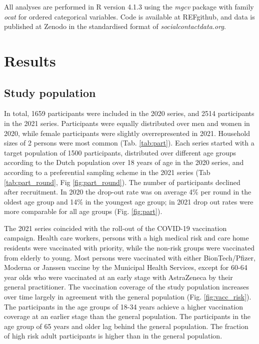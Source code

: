 \documentclass[fleqn,10pt]{wlscirep}
\begin{document}
All analyses are performed in R version 4.1.3 \cite{R_2022} using the \textit{mgcv} package \cite{Wood_2017} with family \textit{ocat} for ordered categorical variables. Code is available at REFgithub, and data is published at Zenodo \cite{Bogaardt_2022} in the standardised format of \textit{socialcontactdata.org}.

\section*{Results}

\subsection*{Study population}

In total, 1659 participants were included in the 2020 series, and 2514 participants in the 2021 series. Participants were equally distributed over men and women in 2020, while female participants were slightly overrepresented in 2021. Household sizes of 2 persons were most common (Tab. \ref{tab:part}). Each series started with a target population of 1500 participants, distributed over different age groups according to the Dutch population over 18 years of age in the 2020 series, and according to a preferential sampling scheme in the 2021 series (Tab \ref{tab:part_round}, Fig \ref{fig:part_round}). The number of participants declined after recruitment. In 2020 the drop-out rate was on average 4\% per round in the oldest age group and 14\% in the youngest age group; in 2021 drop out rates were more comparable for all age groups (Fig. \ref{fig:part}).

The 2021 series coincided with the roll-out of the COVID-19 vaccination campaign. Health care workers, persons with a high medical risk and care home residents were vaccinated with priority, while the non-risk groups were vaccinated from elderly to young. Most persons were vaccinated with either BionTech/Pfizer, Moderna or Janssen vaccine by the Municipal Health Services, except for 60-64 year olds who were vaccinated at an early stage with AstraZeneca by their general practitioner. The vaccination coverage of the study population increases over time largely in agreement with the general population (Fig. \ref{fig:vacc_risk}). The participants in the age groups of 18-34 years achieve a higher vaccination coverage at an earlier stage than the general population. The participants in the age group of 65 years and older lag behind the general population. The fraction of high risk adult participants is higher than in the general population.
\end{document}
